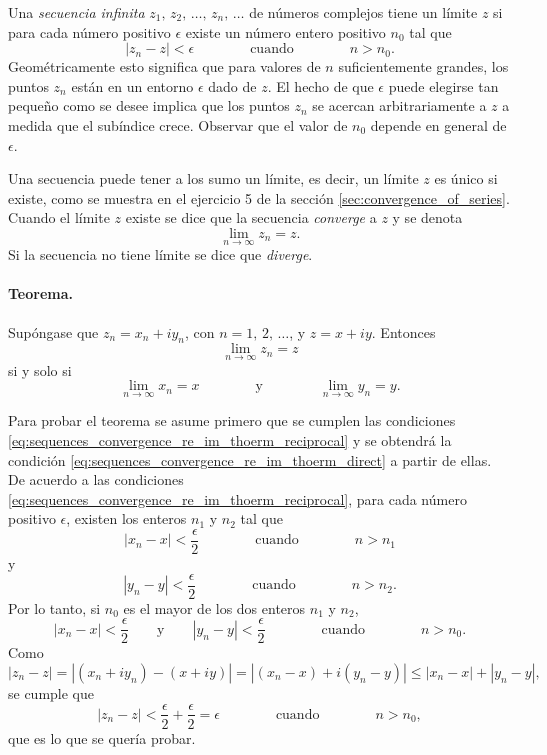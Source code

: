\documentclass[a4paper]{report}
\begin{document}
Una \emph{secuencia infinita} \(z_1,\,z_2,\,\dots,\,z_n,\,\dots\) de números complejos tiene un límite \(z\) si para cada número positivo \(\epsilon\) existe un número entero positivo \(n_0\) tal que 
\begin{equation}\label{eq:sequences_convergence_definition}
 |z_n-z|<\epsilon
 \qquad\qquad 
 \textrm{cuando}
 \qquad\qquad
 n>n_0. 
\end{equation}
Geométricamente esto significa que para valores de \(n\) suficientemente grandes, los puntos \(z_n\) están en un entorno \(\epsilon\) dado de \(z\). El hecho de que \(\epsilon\) puede elegirse tan pequeño como se desee implica que los puntos \(z_n\) se acercan arbitrariamente a \(z\) a medida que el subíndice crece. Observar que el valor de \(n_0\) depende en general de \(\epsilon\).

Una secuencia puede tener a los sumo un límite, es decir, un límite \(z\) es único si existe, como se muestra en el ejercicio 5 de la sección \ref{sec:convergence_of_series}. Cuando el límite \(z\) existe se dice que la secuencia \emph{converge} a \(z\) y se denota
\[
 \lim_{n\to\infty}z_n=z.
\]
Si la secuencia no tiene límite se dice que \emph{diverge}.

\paragraph{Teorema.} Supóngase que \(z_n=x_n+iy_n\), con \(n=1,\,2,\,\dots\), y \(z=x+iy\). Entonces
\begin{equation}\label{eq:sequences_convergence_re_im_thoerm_direct}
 \lim_{n\to\infty}z_n=z 
\end{equation}
si y solo si
\begin{equation}\label{eq:sequences_convergence_re_im_thoerm_reciprocal}
 \lim_{n\to\infty}x_n=x
 \qquad\qquad\textrm{y}\qquad\qquad
 \lim_{n\to\infty}y_n=y. 
\end{equation}

Para probar el teorema se asume primero que se cumplen las condiciones \ref{eq:sequences_convergence_re_im_thoerm_reciprocal} y se obtendrá la condición \ref{eq:sequences_convergence_re_im_thoerm_direct} a partir de ellas. De acuerdo a las condiciones \ref{eq:sequences_convergence_re_im_thoerm_reciprocal}, para cada número positivo \(\epsilon\), existen los enteros \(n_1\) y \(n_2\) tal que  
\[
 |x_n-x|<\frac{\epsilon}{2}
 \qquad\qquad 
 \textrm{cuando}
 \qquad\qquad
 n>n_1
\]
y
\[
 |y_n-y|<\frac{\epsilon}{2}
 \qquad\qquad 
 \textrm{cuando}
 \qquad\qquad
 n>n_2.
\]
Por lo tanto, si \(n_0\) es el mayor de los dos enteros \(n_1\) y \(n_2\),
\[
 |x_n-x|<\frac{\epsilon}{2}
 \qquad\textrm{y}\qquad
 |y_n-y|<\frac{\epsilon}{2}
 \qquad\qquad\textrm{cuando}\qquad\qquad
 n>n_0.
\]
Como
\[
 |z_n-z|=|(x_n+iy_n)-(x+iy)|=|(x_n-x)+i(y_n-y)|\leq|x_n-x|+|y_n-y|,
\]
se cumple que 
\[
 |z_n-z|<\frac{\epsilon}{2}+\frac{\epsilon}{2}=\epsilon
 \qquad\qquad\textrm{cuando}\qquad\qquad
 n>n_0,
\]
que es lo que se quería probar. 
\end{document}
